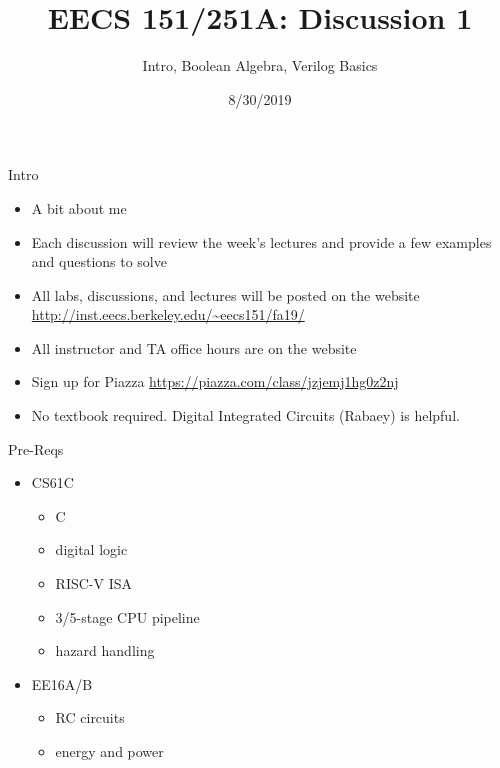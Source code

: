 \documentclass[12pt]{beamer}
\title{EECS 151/251A: Discussion 1}
\subtitle{Intro, Boolean Algebra, Verilog Basics}
\author{}
\date{8/30/2019}
\begin{document}
\begin{frame}
    \maketitle
\end{frame}

\begin{frame}{Intro}
  \begin{itemize}
  \setlength\itemsep{0.75em}
    \item A bit about me
    \item Each discussion will review the week's lectures and provide a few examples and questions to solve
    \item All labs, discussions, and lectures will be posted on the website \url{http://inst.eecs.berkeley.edu/~eecs151/fa19/}
    \item All instructor and TA office hours are on the website
    \item Sign up for Piazza \url{https://piazza.com/class/jzjemj1hg0z2nj}
    \item No textbook required. Digital Integrated Circuits (Rabaey) is helpful.
  \end{itemize}
\end{frame}

\begin{frame}{Pre-Reqs}
  \begin{itemize}
  \setlength\itemsep{0.75em}
    \item CS61C
      \begin{itemize}
        \item C
        \item digital logic
        \item RISC-V ISA
        \item 3/5-stage CPU pipeline
        \item hazard handling
      \end{itemize}
    \item EE16A/B
      \begin{itemize}
        \item RC circuits
        \item energy and power
      \end{itemize}
  \end{itemize}
\end{frame}
\end{document}
